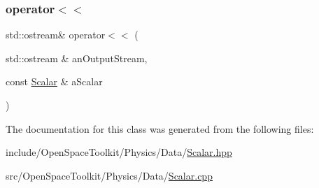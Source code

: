 \subsubsection{\texorpdfstring{operator$<$$<$}{operator<<}}
{\footnotesize\ttfamily std\+::ostream\& operator$<$$<$ (\begin{DoxyParamCaption}\item[{std\+::ostream \&}]{an\+Output\+Stream,  }\item[{const \hyperlink{classostk_1_1physics_1_1data_1_1_scalar}{Scalar} \&}]{a\+Scalar }\end{DoxyParamCaption})\hspace{0.3cm}{\ttfamily [friend]}}



The documentation for this class was generated from the following files\+:\begin{DoxyCompactItemize}
\item 
include/\+Open\+Space\+Toolkit/\+Physics/\+Data/\hyperlink{_scalar_8hpp}{Scalar.\+hpp}\item 
src/\+Open\+Space\+Toolkit/\+Physics/\+Data/\hyperlink{_scalar_8cpp}{Scalar.\+cpp}\end{DoxyCompactItemize}
